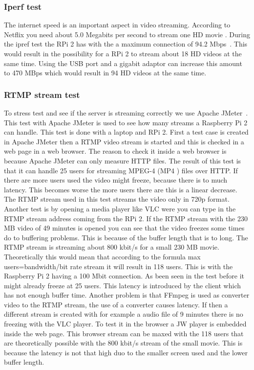 \documentclass{sig-alternate-br}
\begin{document}
\subsubsection{Iperf test}

The internet speed is an important aspect in video streaming. According to Netflix you need about 5.0 Megabits per second to stream one HD movie \cite{netflix}. During the ipref test the RPi 2 has with the a maximum connection of  94.2 Mbps~\cite{ipref}. This would result in the possibility for a RPi 2 to stream about 18 HD videos at the same time. Using the USB port and a gigabit adaptor can increase this amount to 470 MBps which would result in 94 HD videos at the same time. 

\subsubsection{RTMP stream test}

To stress test and see if the server is streaming correctly we use Apache JMeter~\cite{jmeter}. This test with Apache JMeter is used to see how many streams a Raspberry Pi 2 can handle. This test is done with a laptop and RPi 2. First a test case is created in Apache JMeter then a RTMP video stream is started and this is checked in a web page in a web browser. The reason to check it inside a web browser is because Apache JMeter can only measure HTTP files. The result of this test is that it can handle 25 users for streaming MPEG-4 (MP4 ) files over HTTP. If there are more users used the video might freeze, because there is to much latency. This becomes worse the more users there are this is a linear decrease. The RTMP stream used in this test streams the video only in 720p format. \newline Another test is by opening a media player like VLC were you can type in the RTMP stream address coming from the RPi 2. If the RTMP stream with the 230 MB video of 49 minutes is opened you can see that the video freezes some times do to buffering problems. This is because of the buffer length that is to long.  \newline
The RTMP stream is streaming about 800 kbit/s for a small 230 MB movie. Theoretically this would mean that according to the formula max users=bandwidth/bit rate stream it will result in 118 users. This is with the Raspberry Pi 2 having a 100 Mbit connection. As been seen in the test before it might already freeze at 25 users. This latency is introduced by the client which has not enough buffer time. Another problem is that FFmpeg is used as converter video to the RTMP stream, the use of a converter causes latency. \newline
If then a different stream is created with for example a audio file of 9 minutes there is no freezing with the VLC player. \newline To test it in the browser a JW player is embedded inside the web page. This browser stream can be maxed with the 118 users that are theoretically possible with the 800 kbit/s stream of the small movie. This is because the latency is not that high duo to the smaller screen used and the lower buffer length.
 
\end{document}
